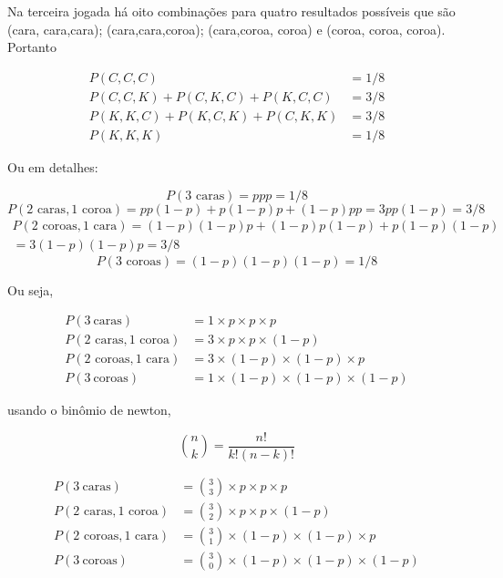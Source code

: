 \documentclass[
]{book}
\begin{document}
Na terceira jogada há oito combinações para quatro resultados possíveis que são (cara, cara,cara); (cara,cara,coroa); (cara,coroa, coroa) e (coroa, coroa, coroa). Portanto

\begin{align*}
  P(C,C,C) &= 1/8 \\
  P(C,C,K) + P(C,K,C) + P(K,C,C) &= 3/8\\
  P(K,K,C) + P(K,C,K) + P(C,K,K) &= 3/8\\
  P(K,K,K) &= 1/8
\end{align*}

Ou em detalhes:

\begin{equation*}
  P(3\text{ caras}) = ppp = 1/8
\end{equation*}
\begin{equation*}
  P(2\text{ caras}, 1\text{ coroa}) = pp(1-p) + p(1-p)p + (1-p)pp = 3pp(1-p) = 3/8
\end{equation*}
\begin{multline*}
  P(2\text{ coroas}, 1\text{ cara}) = (1-p)(1-p)p + (1-p)p(1-p) + p(1-p)(1-p)\\
  = 3(1-p)(1-p)p = 3/8
\end{multline*}
\begin{equation*}
  P(3\text{ coroas}) = (1-p)(1-p)(1-p) = 1/8
\end{equation*}

Ou seja,

\begin{align*}
  P( 3~\text{caras}) &= 1\times p \times p \times p\\
  P(2\text{ caras}, 1\text{ coroa}) &= 3 \times p \times p \times (1-p)\\
  P(2\text{ coroas}, 1\text{ cara}) &= 3  \times (1-p) \times (1-p) \times p\\
  P( 3~\text{coroas}) &= 1\times (1-p) \times (1-p) \times (1-p)
\end{align*}

usando o binômio de newton,

\begin{equation*}
  \binom{n}{k} = \frac{n!}{k!(n-k)!}
\end{equation*}

\begin{align*}
  P( 3~\text{caras}) &= \binom{3}{3} \times p \times p \times p\\
  P(2\text{ caras}, 1\text{ coroa}) &= \binom{3}{2} \times p \times p \times (1-p)\\
  P(2\text{ coroas}, 1\text{ cara}) &= \binom{3}{1} \times (1-p) \times (1-p) \times p\\
  P( 3~\text{coroas}) &= \binom{3}{0} \times (1-p) \times (1-p) \times (1-p)
\end{align*}
\end{document}
